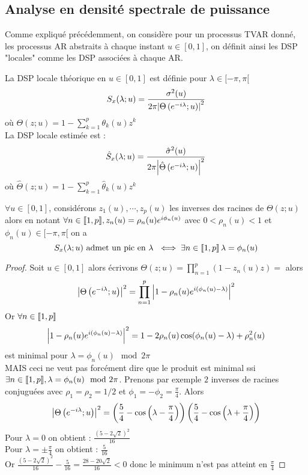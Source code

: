 \documentclass{report}
\begin{document}
\subsection{Analyse en densité spectrale de puissance}
Comme expliqué précédemment, on considère pour un processus TVAR donné, les processus AR abstraits à chaque instant $u\in [0,1]$, on définit ainsi les DSP "locales" comme les DSP associées à chaque AR.
\begin{Def}[DSP]
La DSP locale théorique en $u\in [0,1]$ est définie pour $\lambda \in [-\pi, \pi[$ 
$$
S_x(\lambda ; u) = \frac{\sigma^2(u)}{2\pi{ \left| \Theta\left( e^{-i\lambda} ; u \right) \right|}^2}
$$
où $\Theta(z;u) = 1 - \sum_{k=1}^p \theta_k(u) z^k$ \\
La DSP locale estimée est : 
$$
\hat{S}_x(\lambda ; u) = \frac{\hat{\sigma}^2(u)}{2\pi{ \left| \hat{\Theta}\left( e^{-i\lambda} ; u \right) \right|}^2}
$$
où $\hat{\Theta}(z;u) = 1 - \sum_{k=1}^p \hat{\theta}_k(u) z^k$
\end{Def}
\begin{Prop}
$\forall u \in [0,1]$, considérons $z_1(u),\cdots, z_p(u)$ les inverses des racines de $\Theta(z;u)$ alors en notant $\forall n\in { \left\llbracket 1,p \right\rrbracket}, z_n(u) = \rho_n(u) e^{i \phi_n(u)}$ avec $0 < \rho_n(u) <1$ et $\phi_n(u) \in [-\pi, \pi[$ on a 
$$
S_x(\lambda;u) \mbox{ admet un pic en $\lambda$ } \iff \exists n\in { \left\llbracket 1,p \right\rrbracket} \, \lambda = \phi_n(u)
$$
\end{Prop}
\begin{proof}
Soit $u\in [0,1]$ alors écrivons $\Theta(z;u) = \prod_{n=1}^p (1 - z_n(u)z) = $ alors
$$
{ \left| \Theta\left( e^{-i\lambda} ; u \right) \right|}^2 = \prod_{n=1}^p { \left| 1 - \rho_n(u) e^{i(\phi_n(u)-\lambda)} \right|}^2
$$
Or $\forall n \in { \left\llbracket 1,p \right\rrbracket}$
$$
{ \left| 1 - \rho_n(u) e^{i(\phi_n(u)-\lambda)} \right|}^2 = 1 - 2\rho_n(u) \cos(\phi_n(u)-\lambda) + \rho_n^2(u)
$$
est minimal pour $\lambda = \phi_n(u) \mod 2\pi$ \\
MAIS ceci ne veut pas forcément dire que le produit est minimal ssi $\exists n\in { \left\llbracket 1,p \right\rrbracket}, \lambda = \phi_n(u) \mod 2\pi$. Prenons par exemple $2$ inverses de racines conjuguées avec $\rho_1 = \rho_2 = 1/2$ et $\phi_1 = -\phi_2  = \frac{\pi}{4}$. Alors
$$
{ \left| \Theta\left( e^{-i\lambda} ; u \right) \right|}^2
= \left( \frac{5}{4} - \cos\left(\lambda - \frac{\pi}{4} \right) \right) \left( \frac{5}{4} - \cos\left(\lambda + \frac{\pi}{4} \right) \right)
$$
Pour $\lambda = 0$ on obtient : $\frac{(5-2\sqrt{2})^2}{16}$ \\
Pour $\lambda = \pm \frac{\pi}{4}$ on obtient : $\frac{5}{16}$ \\
Or $\frac{(5-2\sqrt{2})^2}{16} - \frac{5}{16} = \frac{28 - 20\sqrt{2}}{16} < 0$ donc le minimum n'est pas atteint en $\frac{\pi}{4}$
\end{proof}
\end{document}
